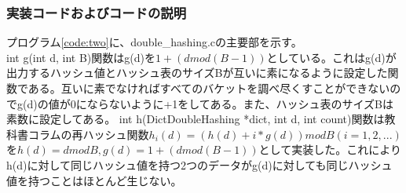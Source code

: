 \documentclass{ltjsarticle}
\begin{document}
\subsubsection{実装コードおよびコードの説明}\label{subsubsec:実装コードおよびコードの説明3}
プログラム\ref{code:two}に、double\_hashing.cの主要部を示す。\\ \indent
int g(int d, int B)関数はg(d)を$1 + (d mod (B-1))$としている。これはg(d)が出力するハッシュ値とハッシュ表のサイズBが互いに素になるように設定した関数である。互いに素でなければすべてのバケットを調べ尽くすことができないのでg(d)の値が0にならないように+1をしてある。また、ハッシュ表のサイズBは素数に設定してある。
int h(DictDoubleHashing *dict, int d, int count)関数は教科書コラムの再ハッシュ関数$h_i(d) = (h(d) + i*g(d)) mod B (i=1,2,...)$を$h(d) = d mod B, g(d) = 1 + (d mod (B-1))$として実装した。これによりh(d)に対して同じハッシュ値を持つ2つのデータがg(d)に対しても同じハッシュ値を持つことはほとんど生じない。
\end{document}
